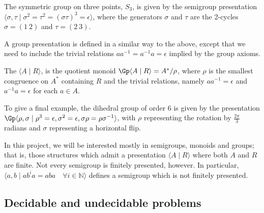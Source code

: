 \documentclass[noindex,noinsetproof,emphthm,12pt]{lmaths}
\begin{document}
\begin{example}
	The symmetric group on three points, $S_3$, is given by the semigroup presentation $\langle \sigma, \tau \mid \sigma^2 = \tau^2 = (\sigma\tau)^3 = \epsilon \rangle$, where the generators $\sigma$ and $\tau$ are the 2-cycles $\sigma = (1\ 2)$ and $\tau = (2\ 3)$.
\end{example}

A group presentation is defined in a similar way to the above, except that we need to include the trivial relations $aa^{-1} = a^{-1}a = \epsilon$ implied by the group axioms.

\begin{defn}
	The  $\langle A \mid R\rangle$, is the quotient monoid $\Gp \langle A \mid R\rangle = A^*/\rho$, where $\rho$ is the smallest congruence on $A^*$ containing $R$ and the trivial relations, namely $aa^{-1} = \epsilon$ and $a^{-1}a = \epsilon$ for each $a \in A$.
\end{defn}

To give a final example, the dihedral group of order 6 is given by the presentation $\Gp \langle \rho, \sigma \mid \rho^3 = \epsilon, \sigma^2 = \epsilon, \sigma\rho = \rho\sigma^{-1} \rangle$, with $\rho$ representing the rotation by $\frac{2\pi}{3}$ radians and $\sigma$ representing a horizontal flip.

In this project, we will be interested mostly in  semigroups, monoids and groups; that is, those structures which admit a presentation $\langle A \mid R\rangle$ where both $A$ and $R$ are finite. Not every semigroup is finitely presented, however. In particular, $\langle a, b \mid ab^ia = aba \quad\forall i \in \mathbb{N} \rangle$ defines a semigroup which is not finitely presented.


\subsection{Decidable and undecidable problems}

\end{document}
